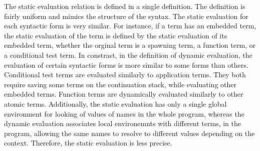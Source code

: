 \documentclass[letterpaper, 11pt]{extarticle}
\begin{document}
The static evaluation relation is defined in a single definition.
The definition is fairly uniform and mimics the structure of the syntax.
The static evaluation for each syntactic form is very similar.
For instance, if a term has an embedded term,
the static evaluation of the term is defined
by the static evaluation of its embedded term,
whether the orginal term is a spawning term, a function term, or a conditional test term.
In constrast, in the definition of dynamic evaluation,
the evaluation of certain syntactic forms is more similar to some forms than others.
Conditional test terms are evaluated similarly to application terms. They both require
saving some terms on the continuation stack, while evaluating other embedded terms.
Function terms are dynamically evaluated similarly to other atomic terms.
Additionally, the static evaluation has only a single global environment for
looking of values of names in the whole program, whereas the dynamic evaluation
associates local environemnts with different terms, in the program, allowing the same
names to resolve to different values depending on the context.  Therefore, the
static evaluation is less precise.
\end{document}
